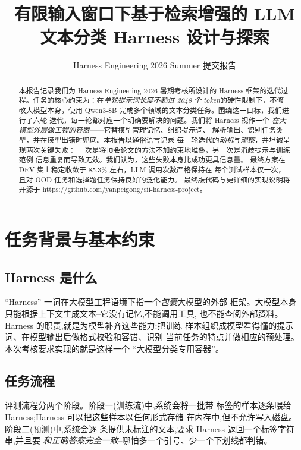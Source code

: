 \documentclass[10pt,twocolumn,letterpaper]{article}
\title{有限输入窗口下基于检索增强的 LLM 文本分类 Harness 设计与探索}
\author{Harness Engineering 2026 Summer 提交报告}
\date{}
\begin{document}
\maketitle
\thispagestyle{empty}

\begin{abstract}
	\noindent
	本报告记录我们为 Harness Engineering 2026 暑期考核所设计的 Harness
	框架的迭代过程。任务的核心约束为：在\emph{单轮提示词长度不超过
		2048 个 token}的硬性限制下，不修改大模型本身，使用 Qwen3-8B
	完成多个领域的文本分类任务。围绕这一目标，我们进行了六轮
	迭代，每一轮都对应一个明确要解决的问题。我们将 Harness 视作一个
	\emph{在大模型外层做工程的容器}——它替模型管理记忆、组织提示词、
	解析输出、识别任务类型，并在模型出错时兜底。本报告以通俗语言记录
	每一轮迭代的\emph{动机}与\emph{观察}，并坦诚呈现两次关键失败：
	一次是将顶会论文的方法不加约束地堆叠，另一次是消歧提示与训练范例
	信息重复而导致无效。我们认为，这些失败本身比成功更具信息量。
	最终方案在 DEV 集上稳定收敛于 85.3\% 左右，LLM 调用次数严格保持在
	每个测试样本仅一次，且对 OOD 任务和选择题任务保持良好的泛化能力。
	最终版代码与更详细的实现说明将开源于 
	\url{https://github.com/yanpeigong/sii-harness-project}。
\end{abstract}
\section{任务背景与基本约束}
\label{sec:task}

\subsection{Harness 是什么}
``Harness'' 一词在大模型工程语境下指一个\emph{包裹}大模型的外部
框架。大模型本身只能根据上下文生成文本--它没有记忆,不能调用工具,
也不能查阅外部资料。Harness 的职责,就是为模型补齐这些能力:把训练
样本组织成模型看得懂的提示词、在模型输出后做格式校验和容错、识别
当前任务的特点并做相应的预处理。本次考核要求实现的就是这样一个
``大模型分类专用容器''。

\subsection{任务流程}
评测流程分两个阶段。阶段一(训练流)中,系统会将一批带
标签的样本逐条喂给 Harness;Harness 可以把这些样本以任何形式存储
在内存中,但不允许写入磁盘。阶段二(预测)中,系统会逐
条提供未标注的文本,要求 Harness 返回一个标签字符串,并且要\emph{
和正确答案完全一致}--哪怕多一个引号、少一个下划线都判错。
\end{document}

